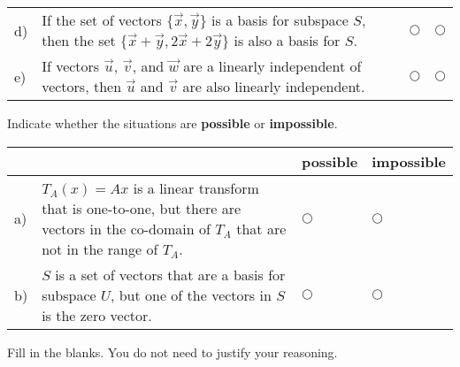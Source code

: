 \documentclass[12pt]{exam}
\begin{document}
\begin{questions}
\begin{center}
\begin{tabular}{ p{.15cm} p{13.6cm} p{.6cm} p{.6cm} }
        d) & If the set of vectors $\{\vec x, \vec y\}$ is a basis for subspace $S$, then the set $\{\vec x + \vec y, 2\vec x + 2 \vec y\}$ is also a basis for $S$.  & $\bigcirc$  & $\bigcirc$ \\ 

        e) & If vectors $\vec u$, $\vec v$, and $\vec w$ are a linearly independent of vectors, then $\vec u$ and $\vec v$ are also linearly independent.  & $\bigcirc$  & $\bigcirc$ \\
        
        \hline
        
    \end{tabular}
    \end{center}
    \setlength{\extrarowheight}{0.0cm}

    \question[2] Indicate whether the situations are \textbf{possible} or \textbf{impossible}.

    \vspace{-0.8cm}
    \setlength{\extrarowheight}{0.20cm}
    \begin{center}
    \hspace{-.9cm}\begin{tabular}{ p{0.20cm} p{12cm} p{1.4cm} p{1.75cm} }
        
        & & possible &  impossible  \\[2pt] \hline 
        
        a) & $T_A(x) = Ax$ is a linear transform that is one-to-one, but there are vectors in the co-domain of $T_A$ that are not in the range of $T_A$. & $\bigcirc$  & $\bigcirc$ \\ 
        
        b) & $S$ is a set of vectors that are a basis for subspace $U$, but one of the vectors in $S$ is the zero vector. & $\bigcirc$  & $\bigcirc$ \\[8pt] 
        
        \hline
        
    \end{tabular}
    \end{center}
    \setlength{\extrarowheight}{0.0cm}
    \vspace{-6pt} 

    \question[4] Fill in the blanks. You do not need to justify your reasoning. 
    
    \begin{parts}


\end{parts}
\end{questions}
\end{document}
